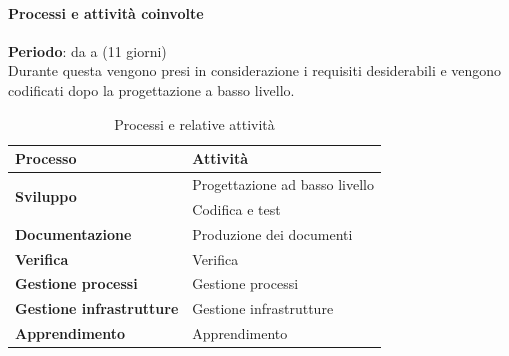 		\paragraph{Processi e attività coinvolte}
			\textbf{Periodo}: da  a  (11 giorni) \\
			Durante questa  vengono presi in considerazione i requisiti desiderabili e vengono codificati dopo la progettazione a basso livello.
			\begin{table}[H]
				\centering
				\begin{tabular}{ll}
					\toprule
					\textbf{Processo}                           & \textbf{Attività}              \\
					\midrule
					\multirow{2}{*}{\textbf{Sviluppo}}          & Progettazione ad basso livello \\
					& Codifica e test \\
					\midrule
					\textbf{Documentazione}            & Produzione dei documenti       \\
					\midrule
					\textbf{Verifica}                  & Verifica                       \\
					\midrule
					\textbf{Gestione processi} 					& Gestione processi              \\
					\midrule
					\textbf{Gestione infrastrutture}				& Gestione infrastrutture        \\
					\midrule
					\textbf{Apprendimento} 						& Apprendimento                 \\
					\bottomrule
				\end{tabular}
				\caption{Processi e relative attività}
				\label{Pdrd-ProcessiAttività}
			\end{table}
